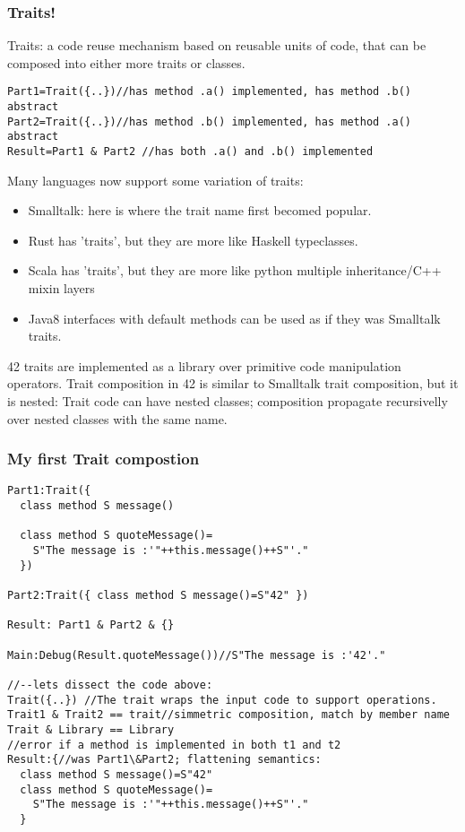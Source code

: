 \begin{frame}[fragile]
\frametitle{Traits!}
Traits: a code reuse mechanism based on reusable
units of code, that can be composed into either more traits or classes.

\begin{NiceCode}{59ex}{0.8}
\begin{lstlisting}
Part1=Trait({..})//has method .a() implemented, has method .b() abstract
Part2=Trait({..})//has method .b() implemented, has method .a() abstract
Result=Part1 & Part2 //has both .a() and .b() implemented
\end{lstlisting}
\end{NiceCode}

Many languages now support some variation of traits:
\begin{itemize}
\item Smalltalk: here is where the trait name first becomed popular.
\item Rust has 'traits', but they are more like Haskell typeclasses.
\item Scala has 'traits', but they are more like python multiple inheritance/C++ mixin layers
\item Java8 interfaces with default methods can be used as if they was Smalltalk traits.
\end{itemize}
42 traits are implemented as a library over primitive code manipulation operators.
Trait composition in 42 is similar to Smalltalk trait composition, but it is nested:
Trait code can have nested classes; composition propagate recursivelly over nested classes with the same name. 
\end{frame}



\begin{frame}[fragile]
\frametitle{My first Trait compostion}
\begin{NiceCode}{59ex}{0.8}
\begin{lstlisting}
Part1:Trait({
  class method S message()

  class method S quoteMessage()=
    S"The message is :'"++this.message()++S"'."
  })

Part2:Trait({ class method S message()=S"42" })

Result: Part1 & Part2 & {}

Main:Debug(Result.quoteMessage())//S"The message is :'42'."

//--lets dissect the code above:
Trait({..}) //The trait wraps the input code to support operations.
Trait1 & Trait2 == trait//simmetric composition, match by member name
Trait & Library == Library
//error if a method is implemented in both t1 and t2
Result:{//was Part1\&Part2; flattening semantics:
  class method S message()=S"42"
  class method S quoteMessage()=
    S"The message is :'"++this.message()++S"'."
  }
\end{lstlisting}
\end{NiceCode}
\end{frame}




